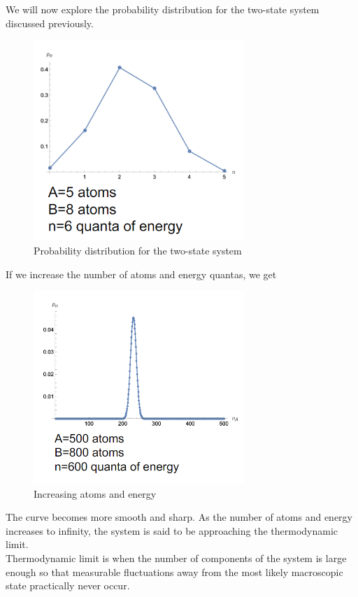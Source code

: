 \documentclass[12pt, a4paper]{article}
\begin{document}
We will now explore the probability distribution for the two-state system discussed previously.

\begin{figure}[H]
\centering
\includegraphics[width=80mm]{8.png}
\caption{Probability distribution for the two-state system}
\end{figure}

If we increase the number of atoms and energy quantas, we get

\begin{figure}[H]
\centering
\includegraphics[width=80mm]{9.png}
\caption{Increasing atoms and energy}
\end{figure}

The curve becomes more smooth and sharp. As the number of atoms and energy increases to infinity, the system is said to be approaching the thermodynamic limit. \\

Thermodynamic limit is when the number of components of the system is large enough so that measurable fluctuations away from the most likely macroscopic state practically never occur. \\
\end{document}
